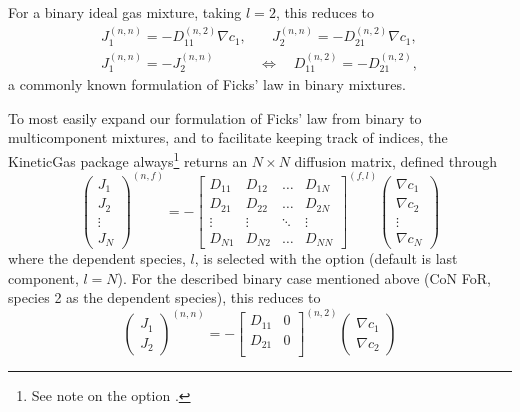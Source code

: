 For a binary ideal gas mixture, taking $l = 2$, this reduces to
\begin{equation}
    \begin{split}
        J_1^{(n, n)} = - D_{11}^{(n, 2)} \nabla c_1, &\quad J_2^{(n, n)} = - D_{21}^{(n, 2)} \nabla c_1, \\
        J_1^{(n, n)} = - J_2^{(n, n)} \quad &\iff \quad D_{11}^{(n, 2)} = - D_{21}^{(n, 2)},
    \end{split}
\end{equation}
a commonly known formulation of Ficks' law in binary mixtures.

To most easily expand our formulation of Ficks' law from binary to multicomponent mixtures, and to facilitate keeping track of indices, the KineticGas package always\footnote{See note on the option .} returns an $N \times N$ diffusion matrix, defined through
\begin{equation}
    \begin{pmatrix}J_1 \\ J_2 \\ \vdots \\ J_N \end{pmatrix}^{(n, f)} = -
    \begin{bmatrix}
    D_{11} & D_{12} & \hdots & D_{1N} \\
    D_{21} & D_{22} & \hdots & D_{2N} \\
    \vdots & \vdots & \ddots & \vdots \\
    D_{N1} & D_{N2} & \hdots & D_{NN}
    \end{bmatrix}^{(f, l)}
    \begin{pmatrix}\nabla c_1 \\ \nabla c_2 \\ \vdots \\ \nabla c_N \end{pmatrix}
    \label{eq:diff_definition}
\end{equation}
where the dependent species, $l$, is selected with the  option (default is last component, $l = N$). For the described binary case mentioned above (CoN FoR, species 2 as the dependent species), this reduces to
\begin{equation}
    \begin{pmatrix}J_1 \\ J_2\end{pmatrix}^{(n, n)} = -
    \begin{bmatrix}
    D_{11} & 0 \\
    D_{21} & 0 \\
    \end{bmatrix}^{(n, 2)}
    \begin{pmatrix}\nabla c_1 \\ \nabla c_2\end{pmatrix}
\end{equation}


